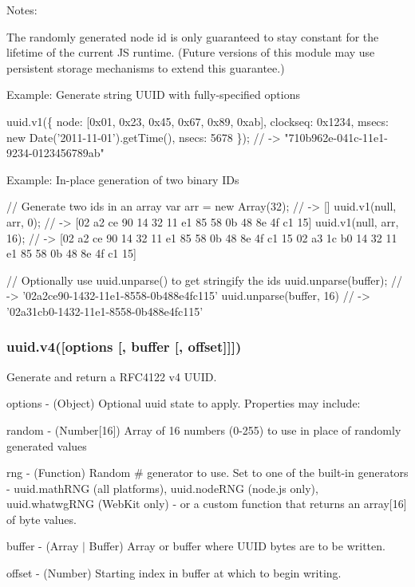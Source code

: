 Notes\+:


\begin{DoxyEnumerate}
\item The randomly generated node id is only guaranteed to stay constant for the lifetime of the current JS runtime. (Future versions of this module may use persistent storage mechanisms to extend this guarantee.)
\end{DoxyEnumerate}

Example\+: Generate string U\+U\+ID with fully-\/specified options


\begin{DoxyCode}
uuid.v1(\{
  node: [0x01, 0x23, 0x45, 0x67, 0x89, 0xab],
  clockseq: 0x1234,
  msecs: new Date('2011-11-01').getTime(),
  nsecs: 5678
\});   // -> "710b962e-041c-11e1-9234-0123456789ab"
\end{DoxyCode}


Example\+: In-\/place generation of two binary I\+Ds


\begin{DoxyCode}
// Generate two ids in an array
var arr = new Array(32); // -> []
uuid.v1(null, arr, 0);   // -> [02 a2 ce 90 14 32 11 e1 85 58 0b 48 8e 4f c1 15]
uuid.v1(null, arr, 16);  // -> [02 a2 ce 90 14 32 11 e1 85 58 0b 48 8e 4f c1 15 02 a3 1c b0 14 32 11 e1 85
       58 0b 48 8e 4f c1 15]

// Optionally use uuid.unparse() to get stringify the ids
uuid.unparse(buffer);    // -> '02a2ce90-1432-11e1-8558-0b488e4fc115'
uuid.unparse(buffer, 16) // -> '02a31cb0-1432-11e1-8558-0b488e4fc115'
\end{DoxyCode}


\subsubsection*{uuid.\+v4(\mbox{[}{\ttfamily options} \mbox{[}, {\ttfamily buffer} \mbox{[}, {\ttfamily offset}\mbox{]}\mbox{]}\mbox{]})}

Generate and return a R\+F\+C4122 v4 U\+U\+ID.


\begin{DoxyItemize}
\item {\ttfamily options} -\/ (Object) Optional uuid state to apply. Properties may include\+:
\begin{DoxyItemize}
\item {\ttfamily random} -\/ (Number\mbox{[}16\mbox{]}) Array of 16 numbers (0-\/255) to use in place of randomly generated values
\item {\ttfamily rng} -\/ (Function) Random \# generator to use. Set to one of the built-\/in generators -\/ {\ttfamily uuid.\+math\+R\+NG} (all platforms), {\ttfamily uuid.\+node\+R\+NG} (node.\+js only), {\ttfamily uuid.\+whatwg\+R\+NG} (Web\+Kit only) -\/ or a custom function that returns an array\mbox{[}16\mbox{]} of byte values.
\end{DoxyItemize}
\item {\ttfamily buffer} -\/ (Array $\vert$ Buffer) Array or buffer where U\+U\+ID bytes are to be written.
\item {\ttfamily offset} -\/ (Number) Starting index in {\ttfamily buffer} at which to begin writing.
\end{DoxyItemize}


